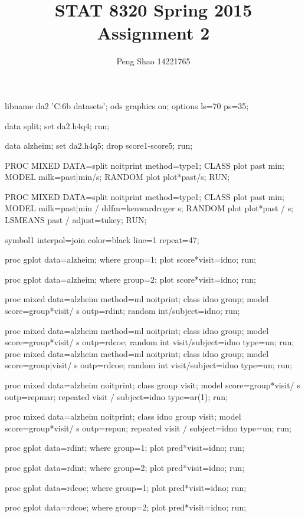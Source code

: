 \documentclass[letterpaper, 12pt]{article}
\begin{document}
\title{STAT 8320 Spring 2015 Assignment 2}
\author{Peng Shao 14221765}
\maketitle
\indent



\begin{Sascode}[store=class]
libname da2 'C:\Users\psy6b\Desktop{} datasets';
ods graphics on;
options ls=70 ps=35;

data split;
set da2.h4q4;
run;

data alzheim;
set da2.h4q5;
drop score1-score5;
run;

PROC MIXED DATA=split noitprint method=type1;
CLASS plot past min;
MODEL milk=past|min/s;
RANDOM plot plot*past/s;
RUN;

PROC MIXED DATA=split noitprint method=type1;
CLASS plot past min;
MODEL milk=past|min / ddfm=kenwardroger s;
RANDOM plot plot*past / s;
LSMEANS past / adjust=tukey;
RUN;

symbol1 interpol=join color=black line=1 repeat=47;

proc gplot data=alzheim;
where group=1;
plot score*visit=idno;
run;

proc gplot data=alzheim;
where group=2;
plot score*visit=idno;
run;

proc mixed data=alzheim method=ml noitprint;
class idno group;
model score=group*visit/ s outp=rdint;
random int/subject=idno;
run;

proc mixed data=alzheim method=ml noitprint;
class idno group;
model score=group*visit/ s outp=rdcoe;
random int visit/subject=idno type=un;
run;
proc mixed data=alzheim method=ml noitprint;
class idno group;
model score=group|visit/ s outp=rdcoe;
random int visit/subject=idno type=un;
run;

proc mixed data=alzheim noitprint;
class group visit;
model score=group*visit/ s outp=repmar;
repeated visit / subject=idno type=ar(1);
run;

proc mixed data=alzheim noitprint;
class idno group visit;
model score=group*visit/ s outp=repun;
repeated visit / subject=idno type=un;
run;

proc gplot data=rdint;
where group=1;
plot pred*visit=idno;
run;

proc gplot data=rdint;
where group=2;
plot pred*visit=idno;
run;

proc gplot data=rdcoe;
where group=1;
plot pred*visit=idno;
run;

proc gplot data=rdcoe;
where group=2;
plot pred*visit=idno;
run;
\end{Sascode}



\end{document}
